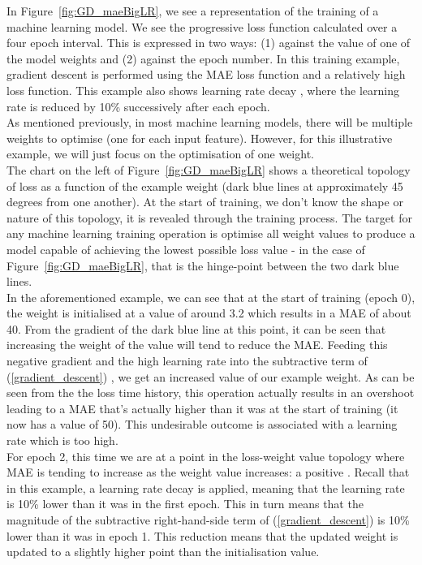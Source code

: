 \noindent
In Figure~\ref{fig:GD_maeBigLR}, we see a representation of the training of a machine learning model. We see the progressive loss function calculated over a four epoch interval. This is expressed in two ways: (1) against the value of one of the model weights and (2) against the epoch number.  In this training example, gradient descent is performed using the MAE loss function and a relatively high loss function. This example also shows learning rate decay \cite{lewkowycz2021decay}, where the learning rate is reduced by 10\% successively after each epoch. \\

\noindent 
As mentioned previously, in most machine learning models, there will be multiple weights to optimise (one for each input feature). However, for this illustrative example, we will just focus on the optimisation of one weight.\\

\noindent
The chart on the left of Figure~\ref{fig:GD_maeBigLR} shows a theoretical topology of loss as a function of the example weight (dark blue lines at approximately 45 degrees from one another). At the start of training, we don't know the shape or nature of this topology, it is revealed through the training process. The target for any machine learning training operation is optimise all weight values to produce a model capable of achieving the lowest possible loss value - in the case of Figure~\ref{fig:GD_maeBigLR}, that is the hinge-point between the two dark blue lines. \\

\noindent 
In the aforementioned example, we can see that at the start of training (epoch 0), the weight is initialised at a value of around 3.2 which results in a MAE of about 40. From the gradient of the dark blue line at this point, it can be seen that increasing the weight of the value will tend to reduce the MAE. Feeding this negative gradient and the high learning rate into the subtractive term of (\ref{gradient_descent}) , we get an increased value of our example weight. As can be seen from the the loss time history, this operation actually results in an overshoot leading to a MAE that's actually higher than it was at the start of training (it now has a value of 50). This undesirable outcome is associated with a learning rate which is too high. \\

\noindent
For epoch 2, this time we are at a point in the loss-weight value topology where MAE is tending to increase as the weight value increases: a positive  . Recall that in this example, a learning rate decay is applied, meaning that the learning rate is 10\% lower than it was in the first epoch. This in turn means that the magnitude of the subtractive right-hand-side term of (\ref{gradient_descent}) is 10\% lower than it was in epoch 1. This reduction means that the updated weight is updated to a slightly higher point than the initialisation value. \\

